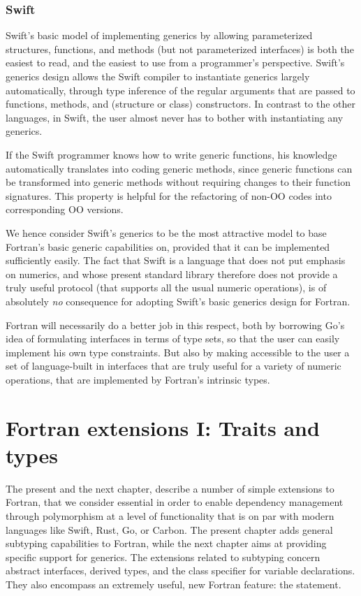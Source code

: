 \documentclass[11pt,oneside]{report}
\newcommand{\code}[1]{{\selectfont\ttfamily{#1}}}
\begin{document}
\subsection{Swift}

Swift's basic model of implementing generics by allowing parameterized
structures, functions, and methods (but not parameterized interfaces)
is both the easiest to read, and the easiest to use from a
programmer's perspective. Swift's generics design allows the Swift
compiler to instantiate generics largely automatically, through type
inference of the regular arguments that are passed to functions,
methods, and (structure or class) constructors. In contrast to the
other languages, in Swift, the user almost never has to bother with
instantiating any generics.

If the Swift programmer knows how to write generic functions, his
knowledge automatically translates into coding generic methods, since
generic functions can be transformed into generic methods without
requiring changes to their function signatures. This property is
helpful for the refactoring of non-OO codes into corresponding OO
versions.

We hence consider Swift's generics to be the most attractive model to
base Fortran's basic generic capabilities on, provided that it can be
implemented sufficiently easily. The fact that Swift is a language
that does not put emphasis on numerics, and whose present standard
library therefore does not provide a truly useful \code{Numeric}
protocol (that supports all the usual numeric operations), is of
absolutely \emph{no} consequence for adopting Swift's basic generics
design for Fortran.

Fortran will necessarily do a better job in this respect, both by
borrowing Go's idea of formulating interfaces in terms of type sets,
so that the user can easily implement his own type constraints. But
also by making accessible to the user a set of language-built in
interfaces that are truly useful for a variety of numeric operations,
that are implemented by Fortran's intrinsic types.


\chapter{Fortran extensions I: Traits and types}

The present and the next chapter, describe a number of simple
extensions to Fortran, that we consider essential in order to enable
dependency management through polymorphism at a level of functionality
that is on par with modern languages like Swift, Rust, Go, or
Carbon. The present chapter adds general subtyping capabilities to
Fortran, while the next chapter aims at providing specific support for
generics. The extensions related to subtyping concern abstract
interfaces, derived types, and the class specifier for variable
declarations. They also encompass an extremely useful, new Fortran
feature: the \code{implements} statement.
\end{document}
